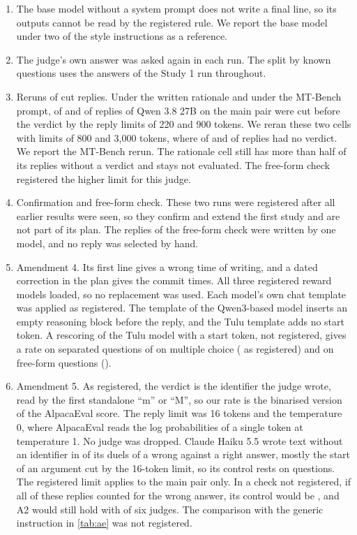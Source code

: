 \documentclass[11pt,letterpaper]{article}
\begin{document}
\begin{enumerate}
  \item The base model without a system prompt does not write a final line, so its outputs cannot be read by the registered rule. We report the base model under two of the style instructions as a reference.
  \item The judge's own answer was asked again in each run. The split by known questions uses the answers of the Study 1 run throughout.
  \item Reruns of cut replies. Under the written rationale and under the MT-Bench prompt, \qwenCotCut{} of \qwenCotTotal{} and \qwenMtCut{} of \qwenMtTotal{} replies of Qwen 3.8 27B on the main pair were cut before the verdict by the reply limits of 220 and 900 tokens. We reran these two cells with limits of 800 and 3{,}000 tokens, where \qwenCotRerunCut{} of \qwenCotRerunTotal{} and \qwenMtRerunCut{} of \qwenMtRerunTotal{} replies had no verdict. We report the MT-Bench rerun. The rationale cell still has more than half of its replies without a verdict and stays not evaluated. The free-form check registered the higher limit for this judge.
  \item Confirmation and free-form check. These two runs were registered after all earlier results were seen, so they confirm and extend the first study and are not part of its plan. The replies of the free-form check were written by one model, and no reply was selected by hand.
  \item Amendment 4. Its first line gives a wrong time of writing, and a dated correction in the plan gives the commit times. All three registered reward models loaded, so no replacement was used. Each model's own chat template was applied as registered. The template of the Qwen3-based model inserts an empty reasoning block before the reply, and the Tulu template adds no start token. A rescoring of the Tulu model with a start token, not registered, gives a rate on separated questions of \rmBosMc{} on multiple choice (\rmTuluMc{} as registered) and \rmBosFf{} on free-form questions (\rmTuluFf{}).
  \item Amendment 5. As registered, the verdict is the identifier the judge wrote, read by the first standalone ``m'' or ``M'', so our rate is the binarised version of the AlpacaEval score. The reply limit was 16 tokens and the temperature 0, where AlpacaEval reads the log probabilities of a single token at temperature 1. No judge was dropped. Claude Haiku 5.5 wrote text without an identifier in \aeHaikuCtrlUnparsed{} of its duels of a wrong against a right answer, mostly the start of an argument cut by the 16-token limit, so its control rests on \aeHaikuCtrlQ{} questions. The registered limit applies to the main pair only. In a check not registered, if all of these replies counted for the wrong answer, its control would be \aeHaikuWorst{}, and A2 would still hold with \aeATwoWithoutHaiku{} of six judges. The comparison with the generic instruction in \cref{tab:ae} was not registered.

\end{enumerate}
\end{document}
